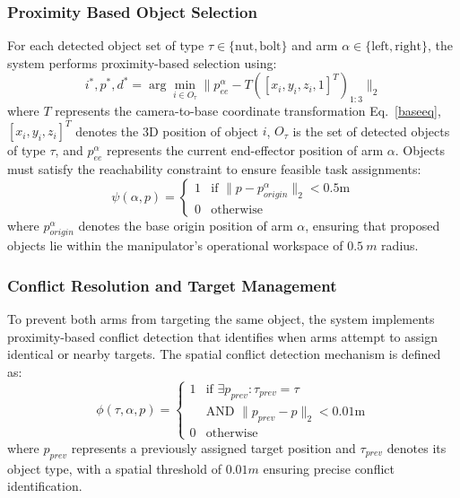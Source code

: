 \documentclass[pdflatex,sn-mathphys-num]{sn-jnl}%
\theoremstyle{thmstyleone}%
\theoremstyle{thmstylethree}%
\begin{document}
\subsubsection*{\textbf{Proximity Based Object Selection}}
For each detected object set of type $\tau \in \{\text{nut}, \text{bolt}\}$ and arm $\alpha \in \{\text{left}, \text{right}\}$, the system performs proximity-based selection using:
\begin{equation}
i^*, p^*, d^* = \arg \min_{i \in O_\tau} \|p_{ee}^\alpha - T([x_i, y_i, z_i, 1]^T)_{1:3}\|_2
\label{eq:distance_selection}
\end{equation}
where $T$ represents the camera-to-base coordinate transformation Eq.~\ref{baseeq}, $[x_i, y_i, z_i]^T$ denotes the 3D position of object $i$, $O_{\tau}$ is the set of detected objects of type $\tau$, and $p_{ee}^\alpha$ represents the current end-effector position of arm $\alpha$.
\noindent Objects must satisfy the reachability constraint to ensure feasible task assignments:
\begin{equation}
\psi(\alpha, p) =
\begin{cases}
1 & \text{if } \|p - p_{origin}^\alpha\|_2 < 0.5\text{m} \\
0 & \text{otherwise}
\end{cases}
\label{eq:workspace_validation}
\end{equation}
where $p_{origin}^\alpha$ denotes the base origin position of arm $\alpha$, ensuring that proposed objects lie within the manipulator's operational workspace of $0.5~m$ radius.

\subsubsection*{\textbf{Conflict Resolution and Target Management}}
To prevent both arms from targeting the same object, the system implements proximity-based conflict detection that identifies when arms attempt to assign identical or nearby targets. The spatial conflict detection mechanism is defined as:
\begin{equation}
\phi(\tau, \alpha, p) =
\begin{cases}
1 & \text{if } \exists p_{prev}: \tau_{prev} = \tau \\
  & \text{AND } \|p_{prev} - p\|_2 < 0.01\text{m} \\
0 & \text{otherwise}
\end{cases}
\label{eq:conflict_detection}
\end{equation}
where $p_{prev}$ represents a previously assigned target position and $\tau_{prev}$ denotes its object type, with a spatial threshold of $0.01m$ ensuring precise conflict identification.
\end{document}
